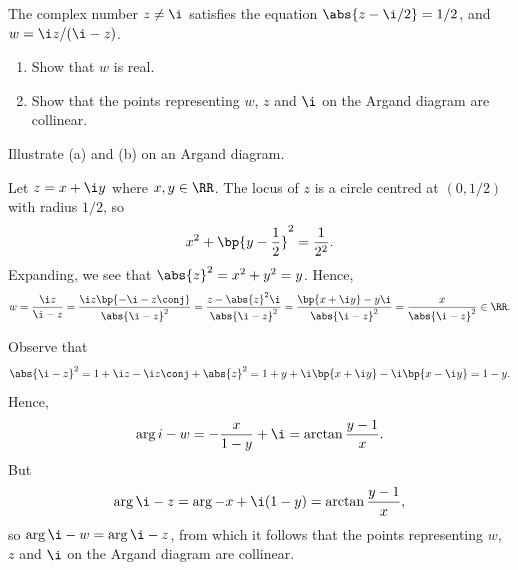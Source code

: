 \begin{problem}
    The complex number $z \neq \i$ satisfies the equation $\abs{z - \i/2} = 1/2$, and $w = \i z / (\i - z)$.
    \begin{enumerate}
        \item Show that $w$ is real.
        \item Show that the points representing $w$, $z$ and $\i$ on the Argand diagram are collinear.
    \end{enumerate}

    Illustrate (a) and (b) on an Argand diagram.
\end{problem}
\begin{solution}
    \begin{ppart}
        Let $z = x + \i y$ where $x, y \in \RR$. The locus of $z$ is a circle centred at $(0, 1/2)$ with radius $1/2$, so \[x^2 + \bp{y - \frac12}^2 = \frac1{2^2}.\] Expanding, we see that $\abs{z}^2 = x^2 + y^2 = y$. Hence, \[w = \frac{\i z}{\i - z} = \frac{\i z \bp{-\i - z\conj}}{\abs{\i - z}^2} = \frac{z - \abs{z}^2 \i}{\abs{\i - z}^2} = \frac{\bp{x + \i y} - y \i}{\abs{\i - z}^2} = \frac{x}{\abs{\i - z}^2} \in \RR.\]
    \end{ppart}
    \begin{ppart}
        Observe that \[\abs{\i - z}^2 = 1 + \i z - \i z\conj + \abs{z}^2 = 1 + y + \i\bp{x + \i y} - \i \bp{x - \i y} = 1 - y.\] Hence, \[\arg{i - w} = -\frac{x}{1 - y} + \i = \arctan \frac{y-1}{x}.\] But \[\arg{\i-z} = \arg{-x + \i(1 - y)} = \arctan \frac{y-1}{x},\] so $\arg{\i - w} = \arg{\i - z}$, from which it follows that the points representing $w$, $z$ and $\i$ on the Argand diagram are collinear.
    \end{ppart}

    \begin{center}
\end{center}
\end{solution}
